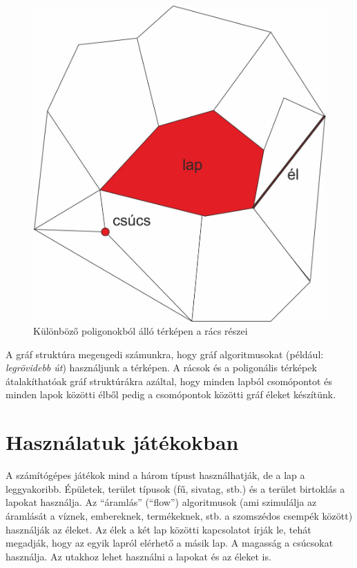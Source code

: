 \begin{figure}[h!]
\centering
\includegraphics[scale=0.4]{kepek/PartsOfGrid2.jpg}
\caption{Különböző poligonokból álló térképen a rács részei}
\label{fig:PartsOfGrid2}
\end{figure}

\noindent A gráf struktúra megengedi számunkra, hogy gráf algoritmusokat (például: \textit{legrövidebb út}) használjunk a térképen. A rácsok és a poligonális térképek átalakíthatóak gráf struktúrákra azáltal, hogy minden lapból csomópontot és minden lapok közötti élből pedig a csomópontok közötti gráf éleket készítünk.

\section*{Használatuk játékokban}

A számítógépes játékok mind a három típust használhatják, de a lap a leggyakoribb. Épületek, terület típusok (fű, sivatag, stb.) és a terület birtoklás a lapokat használja. Az “áramlás” (“flow”) algoritmusok (ami szimulálja az áramlását a víznek, embereknek, termékeknek, stb. a szomszédos csempék között) használják az éleket. Az élek a két lap közötti kapcsolatot írják le, tehát megadják, hogy az egyik lapról elérhető a másik lap. A magasság a csúcsokat használja. Az utakhoz lehet használni a lapokat és az éleket is.

